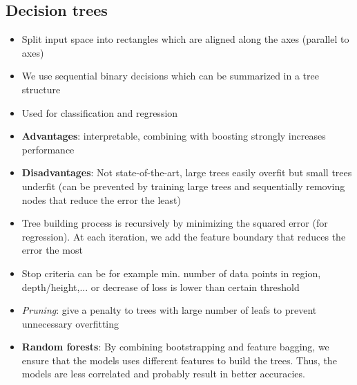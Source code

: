 \subsection{Decision trees}
\begin{itemize}
	\item Split input space into rectangles which are aligned along the axes (parallel to axes)
	\item We use sequential binary decisions which can be summarized in a tree structure
	\item Used for classification and regression
	\item \textbf{Advantages}: interpretable, combining with boosting strongly increases performance
	\item \textbf{Disadvantages}: Not state-of-the-art, large trees easily overfit but small trees underfit (can be prevented by training large trees and sequentially removing nodes that reduce the error the least)
	\item Tree building process is recursively by minimizing the squared error (for regression). At each iteration, we add the feature boundary that reduces the error the most
	\item Stop criteria can be for example min. number of data points in region, depth/height,... or decrease of loss is lower than certain threshold
	\item \textit{Pruning}: give a penalty to trees with large number of leafs to prevent unnecessary overfitting 
	\item \textbf{Random forests}: By combining bootstrapping and feature bagging, we ensure that the models uses different features to build the trees. Thus, the models are less correlated and probably result in better accuracies.
\end{itemize}